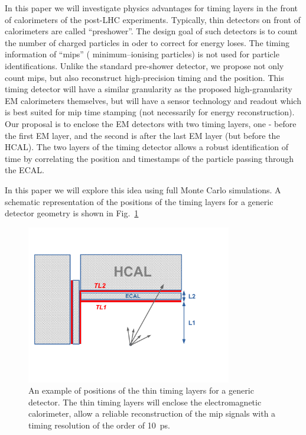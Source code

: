 \documentclass[final,1p,11pt]{elsarticle}
\begin{document}
In this paper we  will investigate physics advantages for timing layers in the front of calorimeters  
of the post-LHC experiments. 
Typically, thin detectors on front of calorimeters are called ``preshower''. The design goal of such detectors is to count the number of charged
particles in oder to correct for energy loses. The timing information of ``mips'' ( minimum–ionising particles) is not used for particle identifications. 
Unlike the standard pre-shower detector, we propose not only count mips, but also reconstruct high-precision timing and the position.
This timing detector will have a similar granularity as the proposed high-granularity EM calorimeters themselves, 
but will have a sensor technology and readout which is best suited for mip time stamping (not necessarily for energy reconstruction). 
Our proposal is to enclose the EM detectors with two timing layers, one - before the first EM layer, and the second is after the last EM layer (but before
the HCAL). The two layers of the timing detector allows a robust identification of time by correlating the position and timestamps of the particle passing through
the ECAL.

In this paper we will explore this idea using full Monte Carlo simulations. 
A schematic representation of the positions of the timing layers for a generic detector geometry is shown in Fig.~\ref{fig:eff_rad}



\begin{figure}
\begin{center}
   \includegraphics[width=0.8\textwidth]{timing_layer.pdf}\hfill
\end{center}
\caption{An example of positions of the thin timing layers for a generic detector. The thin timing layers  will enclose the electromagnetic calorimeter, allow a reliable reconstruction of the  mip signals with a timing resolution of the order of 10~ps.}
\label{fig:eff_rad}
\end{figure}
\end{document}
